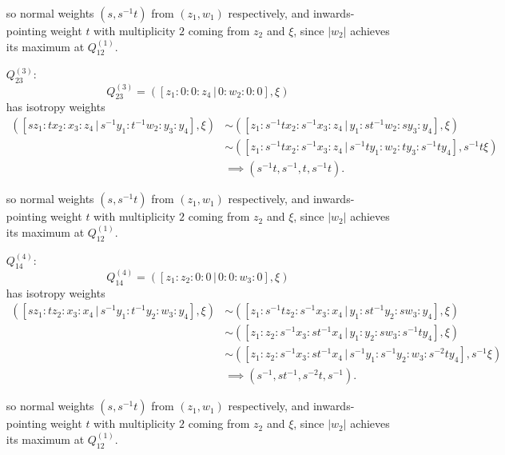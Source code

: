 \documentclass{article}
\begin{document}
\begin{itemize}
		so normal weights $(s, s^{-1}t)$ from $(z_{1}, w_{1})$ respectively, and inwards-pointing weight $t$ with multiplicity $2$ coming from $z_{2}$ and $\xi$, since $|w_{2}|$ achieves its maximum at $Q_{12}^{(1)}$.
	
		\item[$Q_{23}^{(3)}$:]
		\[
		Q_{23}^{(3)} = \left( [ z_{1} : 0 : 0 : z_{4} \, | \, 0 : w_{2} : 0 : 0 ], \xi \right)
		\]
		has isotropy weights
		\begin{align*}
			\left( [sz_{1} : tx_{2} : x_{3} : z_{4} \, | \, s^{-1}y_{1} : t^{-1}w_{2} : y_{3} : y_{4}], \xi \right) &\sim \left( [z_{1} : s^{-1}tx_{2} : s^{-1}x_{3} : z_{4} \, | \, y_{1} : st^{-1}w_{2} : sy_{3} : y_{4}], \xi \right) \\ &\sim \left( [z_{1} : s^{-1}tx_{2} : s^{-1}x_{3} : z_{4} \, | \, s^{-1}ty_{1} : w_{2} : ty_{3} : s^{-1}ty_{4}], s^{-1}t \xi \right) \\ &\implies (s^{-1}t, s^{-1}, t, s^{-1}t).
		\end{align*}
	
		so normal weights $(s, s^{-1}t)$ from $(z_{1}, w_{1})$ respectively, and inwards-pointing weight $t$ with multiplicity $2$ coming from $z_{2}$ and $\xi$, since $|w_{2}|$ achieves its maximum at $Q_{12}^{(1)}$.
	
		\item[$Q_{14}^{(4)}$:]
		\[
		Q_{14}^{(4)} = \left( [ z_{1} : z_{2} : 0 : 0 \, | \, 0 : 0 : w_{3} : 0 ], \xi \right)
		\]
		has isotropy weights
		\begin{align*}
			\left( [sz_{1} : tz_{2} : x_{3} : x_{4} \, | \, s^{-1}y_{1} : t^{-1}y_{2} : w_{3} : y_{4}], \xi \right) &\sim \left( [z_{1} : s^{-1}tz_{2} : s^{-1}x_{3} : x_{4} \, | \, y_{1} : st^{-1}y_{2} : sw_{3} : y_{4}], \xi \right) \\ &\sim \left( [z_{1} : z_{2} : s^{-1}x_{3} : st^{-1}x_{4} \, | \, y_{1} : y_{2} : sw_{3} : s^{-1}ty_{4}], \xi \right) \\ &\sim \left( [z_{1} : z_{2} : s^{-1}x_{3} : st^{-1}x_{4} \, | \, s^{-1}y_{1} : s^{-1}y_{2} : w_{3} : s^{-2}ty_{4}], s^{-1}\xi \right) \\ &\implies (s^{-1}, st^{-1}, s^{-2}t, s^{-1}).
		\end{align*}
	
		so normal weights $(s, s^{-1}t)$ from $(z_{1}, w_{1})$ respectively, and inwards-pointing weight $t$ with multiplicity $2$ coming from $z_{2}$ and $\xi$, since $|w_{2}|$ achieves its maximum at $Q_{12}^{(1)}$.
	
	
	\end{itemize}
	
\end{document}
